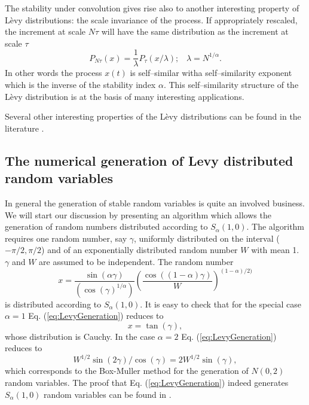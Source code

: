 The stability under convolution gives rise also to another interesting
property of L\`evy distributions: the scale invariance of the process. If
appropriately rescaled, the increment at scale $N \tau$ will have the same
distribution as the increment at scale $\tau$
\begin{displaymath}
  P_{N\tau}(x) = \frac{1}{\lambda} P_{\tau} (x/\lambda); \;\;\; 
  \lambda = N^{1/\alpha}.
\end{displaymath}
In other words the process $x(t)$ is self--similar witha self--similarity
exponent which is the inverse of the stability index $\alpha$. This
self--similarity structure of the L\`evy distribution is at the basis of many
interesting applications.

Several other interesting properties of the L\`evy distributions can be found
in the literature \cite{MontrolBendler,BouchadGeorges}.

\subsection{The numerical generation of Levy distributed random variables}
In general the generation of stable random variables is quite an involved
business. We will start our discussion by presenting an algorithm which allows
the generation of random numbers distributed according to $S_{\alpha}(1,0)$.
The algorithm requires one random number, say $\gamma$, uniformly distributed
on the interval ($-\pi/2,\pi/2$) and of an exponentially distributed random
number $W$ with mean 1. $\gamma$ and $W$ are assumed to be independent.
The random number
\begin{equation}
\label{eq:LevyGeneration}
  x= \frac{\sin(\alpha \gamma)}{(\cos(\gamma)^{1/\alpha})}
       \left(\frac{\cos((1-\alpha)\gamma)}{W} \right)^{(1-\alpha)/2)}
\end{equation}
is distributed according to $S_{\alpha}(1,0)$. It is easy to check that for
the special case $\alpha = 1$ Eq. (\ref{eq:LevyGeneration}) reduces to
\begin{displaymath}
  x = \tan(\gamma),
\end{displaymath}
whose distribution is Cauchy. In the case $\alpha =2$ 
Eq. (\ref{eq:LevyGeneration}) reduces to
\begin{displaymath}
  W^{1/2} \sin(2\gamma) / \cos(\gamma) = 2 W^{1/2} \sin(\gamma),
\end{displaymath}
which corresponds to the Box-Muller method for the generation of  $N(0,2)$
random variables. The proof that Eq. (\ref{eq:LevyGeneration}) indeed
generates $S_{\alpha}(1,0)$ random variables
can be found in \cite{Samorodnitsky}. 

